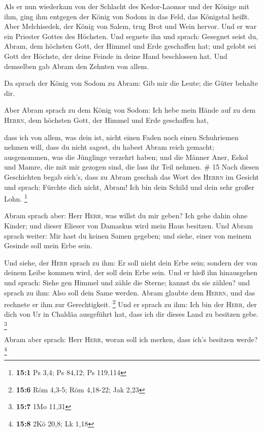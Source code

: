  Als er nun wiederkam von der Schlacht des Kedor-Laomor
und der Könige mit ihm, ging ihm entgegen der König von Sodom in das
Feld, das Königstal heißt.  Aber Melchisedek, der König
von Salem, trug Brot und Wein hervor. Und er war ein Priester Gottes des
Höchsten.  Und segnete ihn und sprach: Gesegnet seist du,
Abram, dem höchsten Gott, der Himmel und Erde geschaffen hat;
 und gelobt sei Gott der Höchste, der deine Feinde in
deine Hand beschlossen hat. Und demselben gab Abram den Zehnten von
allem.

 Da sprach der König von Sodom zu Abram: Gib mir die
Leute; die Güter behalte dir.

 Aber Abram sprach zu dem König von Sodom: Ich hebe mein
Hände auf zu dem \textsc{Herrn}, dem höchsten Gott, der Himmel und Erde
geschaffen hat,

 dass ich von allem, was dein ist, nicht einen Faden noch
einen Schuhriemen nehmen will, dass du nicht sagest, du habest Abram
reich gemacht;  ausgenommen, was die Jünglinge verzehrt
haben; und die Männer Aner, Eskol und Mamre, die mit mir gezogen sind,
die lass ihr Teil nehmen. \# 15  Nach diesen Geschichten
begab sich's, dass zu Abram geschah das Wort des \textsc{Herrn} im
Gesicht und sprach: Fürchte dich nicht, Abram! Ich bin dein Schild und
dein sehr großer Lohn. \footnote{\textbf{15:1} Ps 3,4; Ps 84,12; Ps
  119,114}

 Abram sprach aber: Herr \textsc{Herr}, was willst du mir
geben? Ich gehe dahin ohne Kinder; und dieser Elieser von Damaskus wird
mein Haus besitzen.  Und Abram sprach weiter: Mir hast du
keinen Samen gegeben; und siehe, einer von meinem Gesinde soll mein Erbe
sein.

 Und siehe, der \textsc{Herr} sprach zu ihm: Er soll nicht
dein Erbe sein; sondern der von deinem Leibe kommen wird, der soll dein
Erbe sein.  Und er hieß ihn hinausgehen und sprach: Siehe
gen Himmel und zähle die Sterne; kannst du sie zählen? und sprach zu
ihm: Also soll dein Same werden.  Abram glaubte dem
\textsc{Herrn}, und das rechnete er ihm zur Gerechtigkeit. \footnote{\textbf{15:6}
  Röm 4,3-5; Röm 4,18-22; Jak 2,23}  Und er sprach zu ihm:
Ich bin der \textsc{Herr}, der dich von Ur in Chaldäa ausgeführt hat,
dass ich dir dieses Land zu besitzen gebe. \footnote{\textbf{15:7} 1Mo
  11,31}

 Abram aber sprach: Herr \textsc{Herr}, woran soll ich
merken, dass ich's besitzen werde? \footnote{\textbf{15:8} 2Kö 20,8; Lk
  1,18}

